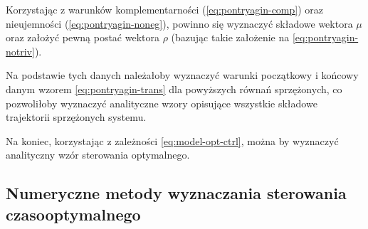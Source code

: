 Korzystając z warunków komplementarności (\ref{eq:pontryagin-comp}) oraz nieujemności (\ref{eq:pontryagin-noneg}), powinno się wyznaczyć składowe wektora $\mu$ oraz założyć pewną postać wektora $\rho$ (bazując takie założenie na \ref{eq:pontryagin-notriv}).

Na podstawie tych danych należałoby wyznaczyć warunki początkowy i końcowy danym wzorem \ref{eq:pontryagin-trans} dla powyższych równań sprzężonych, co pozwoliłoby wyznaczyć analityczne wzory opisujące wszystkie składowe trajektorii sprzężonych systemu.

Na koniec, korzystając z zależności \ref{eq:model-opt-ctrl}, można by wyznaczyć analityczny wzór sterowania optymalnego.


\subsection{Numeryczne metody wyznaczania sterowania czasooptymalnego}
\label{sub:toc-num}

